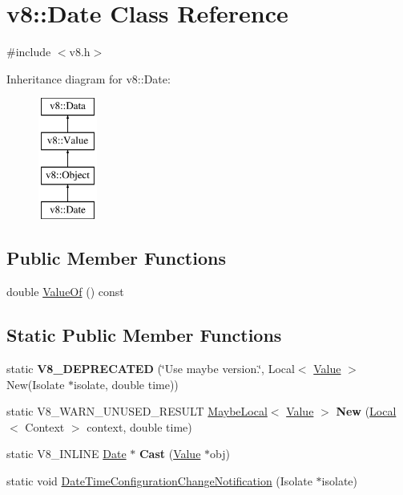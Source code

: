 \hypertarget{classv8_1_1Date}{}\section{v8\+:\+:Date Class Reference}
\label{classv8_1_1Date}


{\ttfamily \#include $<$v8.\+h$>$}

Inheritance diagram for v8\+:\+:Date\+:\begin{figure}[H]
\begin{center}
\leavevmode
\includegraphics[height=4.000000cm]{classv8_1_1Date}
\end{center}
\end{figure}
\subsection*{Public Member Functions}
\begin{DoxyCompactItemize}
\item 
double \mbox{\hyperlink{classv8_1_1Date_adb9d292549a173e045ee177051dbde19}{Value\+Of}} () const
\end{DoxyCompactItemize}
\subsection*{Static Public Member Functions}
\begin{DoxyCompactItemize}
\item 
\mbox{\label{classv8_1_1Date_abd1ff8294e0d5a513696b72b67d36ecf}} 
static {\bfseries V8\+\_\+\+D\+E\+P\+R\+E\+C\+A\+T\+ED} (\char`\"{}Use maybe version.\char`\"{}, Local$<$ \mbox{\hyperlink{classv8_1_1Value}{Value}} $>$ New(Isolate $\ast$isolate, double time))
\item 
\mbox{\label{classv8_1_1Date_a07639d26ad5bc9564c2411a1c14f7d70}} 
static V8\+\_\+\+W\+A\+R\+N\+\_\+\+U\+N\+U\+S\+E\+D\+\_\+\+R\+E\+S\+U\+LT \mbox{\hyperlink{classv8_1_1MaybeLocal}{Maybe\+Local}}$<$ \mbox{\hyperlink{classv8_1_1Value}{Value}} $>$ {\bfseries New} (\mbox{\hyperlink{classv8_1_1Local}{Local}}$<$ Context $>$ context, double time)
\item 
\mbox{\label{classv8_1_1Date_aebb004782ef43f01518f24e662ef6ad8}} 
static V8\+\_\+\+I\+N\+L\+I\+NE \mbox{\hyperlink{classv8_1_1Date}{Date}} $\ast$ {\bfseries Cast} (\mbox{\hyperlink{classv8_1_1Value}{Value}} $\ast$obj)
\item 
static void \mbox{\hyperlink{classv8_1_1Date_adb084ec0683d3d195ad0f78af5f6f72b}{Date\+Time\+Configuration\+Change\+Notification}} (Isolate $\ast$isolate)
\end{DoxyCompactItemize}


